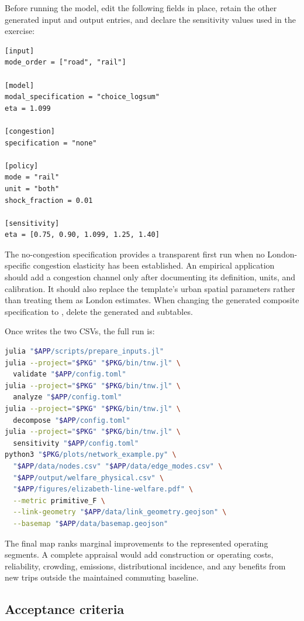 Before running the model, edit the following fields in place, retain the other
generated input and output entries, and declare the sensitivity values used in
the exercise:
\begin{lstlisting}
[input]
mode_order = ["road", "rail"]

[model]
modal_specification = "choice_logsum"
eta = 1.099

[congestion]
specification = "none"

[policy]
mode = "rail"
unit = "both"
shock_fraction = 0.01

[sensitivity]
eta = [0.75, 0.90, 1.099, 1.25, 1.40]
\end{lstlisting}
The no-congestion specification provides a transparent first run when no
London-specific congestion elasticity has been established. An empirical
application should add a congestion channel only after documenting its
definition, units, and calibration. It should also replace the template's
urban spatial parameters rather than treating them as London estimates. When
changing the generated composite specification to , delete the
generated  and  subtables.

\newpage
Once  writes the two CSVs, the full run is:
\begin{lstlisting}[language=bash]
julia "$APP/scripts/prepare_inputs.jl"
julia --project="$PKG" "$PKG/bin/tnw.jl" \
  validate "$APP/config.toml"
julia --project="$PKG" "$PKG/bin/tnw.jl" \
  analyze "$APP/config.toml"
julia --project="$PKG" "$PKG/bin/tnw.jl" \
  decompose "$APP/config.toml"
julia --project="$PKG" "$PKG/bin/tnw.jl" \
  sensitivity "$APP/config.toml"
python3 "$PKG/plots/network_example.py" \
  "$APP/data/nodes.csv" "$APP/data/edge_modes.csv" \
  "$APP/output/welfare_physical.csv" \
  "$APP/figures/elizabeth-line-welfare.pdf" \
  --metric primitive_F \
  --link-geometry "$APP/data/link_geometry.geojson" \
  --basemap "$APP/data/basemap.geojson"
\end{lstlisting}
The final map ranks marginal improvements to the represented operating
segments. A complete appraisal would add construction or operating costs,
reliability, crowding, emissions, distributional incidence, and any benefits
from new trips outside the maintained commuting baseline.

\subsection{Acceptance criteria}

